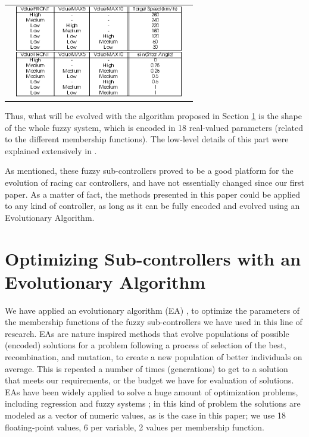\documentclass[10pt,journal,compsoc]{IEEEtran}
\begin{document}
\begin{table}[h!tb]
{%
%      
  \begin{tabular}{c}
\includegraphics[width=8cm, height=4cm, clip=true, trim=0cm 0cm 0cm 0cm]{fig/table1.eps} 
\end{tabular}
}
\end{table}



Thus, what will be evolved with the algorithm proposed in Section
\ref{sec:ga} is the shape of the whole fuzzy system, which is encoded
in 18 real-valued parameters (related to the different membership
functions). The low-level details of this part were explained
extensively in \cite{DBLP:conf/cig/SalemMG19}. 

As mentioned, these fuzzy sub-controllers proved to be a good platform for the evolution of racing car controllers, and have not essentially changed since our first paper. As a matter of fact, the methods presented in this paper could
be applied to any kind of controller, as long as it can be fully
encoded and evolved using an Evolutionary Algorithm. 

\section{Optimizing Sub-controllers with an Evolutionary Algorithm}
\label{sec:ga}

We have applied an evolutionary algorithm (EA) \cite{EAs_Back96}, to optimize the parameters of the membership functions of the fuzzy sub-controllers we have used in this line of research.
EAs are nature inspired methods that evolve populations of possible (encoded) solutions for a problem following a process of selection of the best,
recombination, and mutation, to create a new population of better individuals on average. This is repeated a number of times
(generations) to get to a solution that meets our requirements, or the
budget we have for evaluation of solutions. EAs have been widely
applied to solve a huge amount of optimization problems, including regression and fuzzy systems \cite{hoffmann2001evolutionary}; in this kind of problem the solutions are modeled as a vector of numeric values, as is the
case in this paper; we use 18 floating-point values, 6 per variable, 2 values per membership function.
\end{document}
